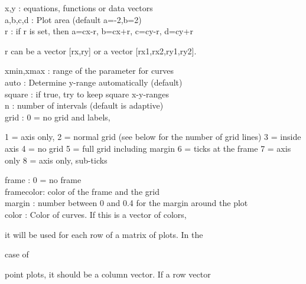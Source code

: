 \documentclass[a4paper,10pt]{article}
\begin{document}
\begin{eulernotebook}
\begin{eulercomment}
x,y       : equations, functions or data vectors\\
a,b,c,d   : Plot area (default a=-2,b=2)\\
r         : if r is set, then a=cx-r, b=cx+r, c=cy-r, d=cy+r\\
\end{eulercomment}
\begin{eulerttcomment}
            r can be a vector [rx,ry] or a vector [rx1,rx2,ry1,ry2].
\end{eulerttcomment}
\begin{eulercomment}
xmin,xmax : range of the parameter for curves\\
auto      : Determine y-range automatically (default)\\
square    : if true, try to keep square x-y-ranges\\
n         : number of intervals (default is adaptive)\\
grid      : 0 = no grid and labels,\\
\end{eulercomment}
\begin{eulerttcomment}
            1 = axis only,
            2 = normal grid (see below for the number of grid lines)
            3 = inside axis
            4 = no grid
            5 = full grid including margin
            6 = ticks at the frame
            7 = axis only
            8 = axis only, sub-ticks
\end{eulerttcomment}
\begin{eulercomment}
frame     : 0 = no frame\\
framecolor: color of the frame and the grid\\
margin    : number between 0 and 0.4 for the margin around the plot\\
color     : Color of curves. If this is a vector of colors,\\
\end{eulercomment}
\begin{eulerttcomment}
            it will be used for each row of a matrix of plots. In the
\end{eulerttcomment}
\begin{eulercomment}
case of\\
\end{eulercomment}
\begin{eulerttcomment}
            point plots, it should be a column vector. If a row vector
\end{eulerttcomment}
\begin{eulercomment}

\end{eulercomment}
\end{eulernotebook}
\end{document}
